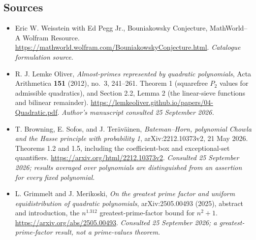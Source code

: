 \documentclass[11pt]{article}
\begin{document}
\subsection{Sources}
\begin{itemize}\raggedright
\item[\textnormal{[S1]}]\hypertarget{source:1292:1}{} Eric W. Weisstein with Ed Pegg Jr., Bouniakowsky Conjecture, MathWorld--A Wolfram Resource.
\url{https://mathworld.wolfram.com/BouniakowskyConjecture.html}.
{\small\textit{Catalogue formulation source.}}
\item[\textnormal{[E1]}]\hypertarget{extra:1292:1}{}
R. J. Lemke Oliver, \emph{Almost-primes represented by quadratic polynomials},
Acta Arithmetica \textbf{151} (2012), no.~3, 241--261.
Theorem 1 (squarefree $P_2$ values for admissible quadratics), and Section 2.2,
Lemma 2 (the linear-sieve functions and bilinear remainder).
\url{https://lemkeoliver.github.io/papers/04-Quadratic.pdf}.
{\small\textit{Author's manuscript consulted 25 September 2026.}}
\item[\textnormal{[E2]}]\hypertarget{extra:1292:2}{}
T. Browning, E. Sofos, and J. Ter\"av\"ainen,
\emph{Bateman--Horn, polynomial Chowla and the Hasse principle with
probability 1}, arXiv:2212.10373v2, 21 May 2026.
Theorems 1.2 and 1.5, including the coefficient-box and exceptional-set
quantifiers. \url{https://arxiv.org/html/2212.10373v2}.
{\small\textit{Consulted 25 September 2026; results averaged over
polynomials are distinguished from an assertion for every fixed polynomial.}}
\item[\textnormal{[E3]}]\hypertarget{extra:1292:3}{}
L. Grimmelt and J. Merikoski,
\emph{On the greatest prime factor and uniform equidistribution of quadratic
polynomials}, arXiv:2505.00493 (2025), abstract and introduction,
the $n^{1.312}$ greatest-prime-factor bound for $n^2+1$.
\url{https://arxiv.org/abs/2505.00493}.
{\small\textit{Consulted 25 September 2026; a greatest-prime-factor result,
not a prime-values theorem.}}
\end{itemize}
\end{document}
